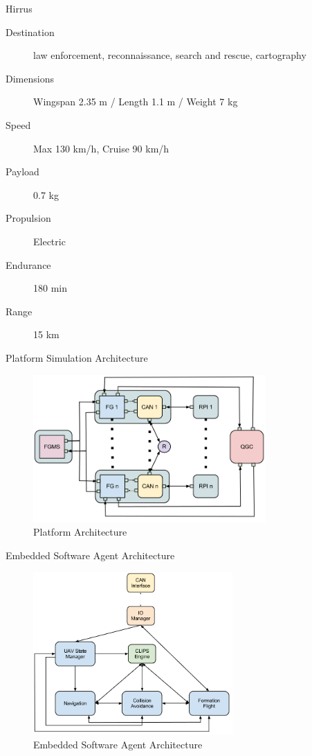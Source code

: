 \documentclass{beamer}
\begin{document}
\begin{frame}{Hirrus}

\begin{description}
\item [Destination] law enforcement, reconnaissance, search and rescue, cartography
\item [Dimensions] Wingspan 2.35 m / Length 1.1 m / Weight 7 kg
\item [Speed] Max 130 km/h, Cruise 90 km/h
\item [Payload] 0.7 kg
\item [Propulsion] Electric
\item [Endurance] 180 min
\item [Range] 15 km
\end{description}

\end{frame}

\begin{frame}{Platform Simulation Architecture}
\begin{center}
\begin{figure}[p]
\includegraphics[width=3.5in]{img/platform-architecture.png}
\caption{Platform Architecture}
\end{figure}
\end{center}
\end{frame}
\begin{frame}{Embedded Software Agent Architecture}
\begin{center}
\begin{figure}[p]
\includegraphics[width=3in]{img/rpi-architecture.png}
\caption{Embedded Software Agent Architecture}
\end{figure}
\end{center}
\end{frame}
\end{document}
